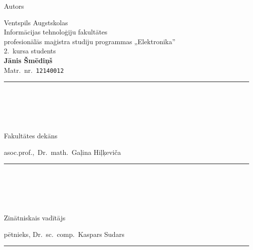 \begin{titlepage}
	\normalsize
	\begin{minipage}[t]{0.3\textwidth}
		\begin{flushleft}
			Autors
		\end{flushleft}
	\end{minipage}
	\begin{minipage}[t]{0.65\textwidth}
		\begin{flushleft}
			Ventspils Augstskolas \\
			Informācijas tehnoloģiju fakultātes \\
			profesionālās maģistra studiju programmas „Elektronika”\\
			2.~kursa students \\
			\textbf{Jānis Šmēdiņš}\\
			Matr.~nr.~\texttt{12140012}\\
			\rule[-1em]{10em}{0.3pt}\\
			\\[1cm]
		\end{flushleft}
	\end{minipage}\\[2em]
	\begin{minipage}[t]{0.3\textwidth}
		\begin{flushleft}
			Fakultātes dekāns
		\end{flushleft}
	\end{minipage}
	\begin{minipage}[t]{0.65\textwidth}
		\begin{flushleft}
			asoc.prof.,~Dr.~math.~Gaļina Hiļķeviča\\[1ex]
			\rule[-1em]{10em}{0.3pt}\\
			\makebox[10em][c]{\tiny (paraksts)}\\[1cm]
		\end{flushleft}
	\end{minipage}\\[2em]
	\begin{minipage}[t]{0.3\textwidth}
		\begin{flushleft}
			Zinātniskais vadītājs
		\end{flushleft}
	\end{minipage}
	\begin{minipage}[t]{0.65\textwidth}
		\begin{flushleft}
			pētnieks, Dr.~sc.~comp.~Kaspars Sudars\\[1ex]
			\rule[-1em]{10em}{0.3pt}\\
			\\[1cm]

\end{flushleft}
\end{minipage}
\end{titlepage}
